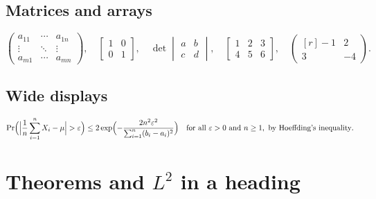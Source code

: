 \documentclass[11pt,letterpaper]{article}
\theoremstyle{definition}
\theoremstyle{remark}
\begin{document}
\subsection{Matrices and arrays}

\[ \begin{pmatrix} a_{11} & \cdots & a_{1n} \\ \vdots & \ddots & \vdots \\ a_{m1} & \cdots & a_{mn} \end{pmatrix}, \quad \begin{bmatrix} 1 & 0 \\ 0 & 1 \end{bmatrix}, \quad \det \begin{vmatrix} a & b \\ c & d \end{vmatrix}, \quad \left[ \begin{array}{cc|c} 1 & 2 & 3 \\ \hline 4 & 5 & 6 \end{array} \right], \quad \begin{pmatrix*}[r] -1 & 2 \\ 3 & -4 \end{pmatrix*}. \]

\subsection{Wide displays}

\[ \Pr\Bigl( \Bigl\lvert \frac{1}{n} \sum_{i=1}^n X_i - \mu \Bigr\rvert > \varepsilon \Bigr) \leq 2 \exp\Bigl( -\frac{2 n^2 \varepsilon^2}{\sum_{i=1}^n (b_i - a_i)^2} \Bigr) \quad \text{for all } \varepsilon > 0 \text{ and } n \geq 1, \text{ by Hoeffding's inequality}. \]


\section{Theorems and \texorpdfstring{$L^2$}{L2} in a heading}
\end{document}
